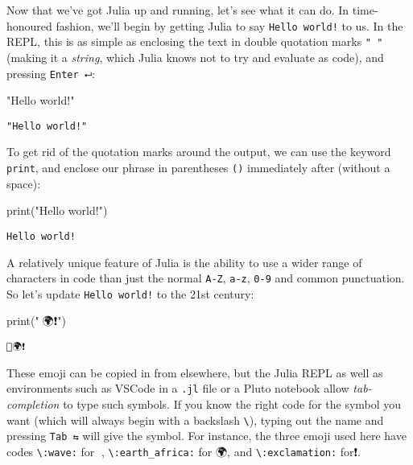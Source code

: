 \documentclass[
  letterpaper,
  DIV=11,
  numbers=noendperiod]{scrreprt}
\newenvironment{Shaded}{\begin{snugshade}}{\end{snugshade}}
\newcommand{\FunctionTok}[1]{\textcolor[rgb]{0.28,0.35,0.67}{#1}}
\newcommand{\NormalTok}[1]{\textcolor[rgb]{0.00,0.23,0.31}{#1}}
\newcommand{\StringTok}[1]{\textcolor[rgb]{0.13,0.47,0.30}{#1}}
\begin{document}
Now that we've got Julia up and running, let's see what it can do. In
time-honoured fashion, we'll begin by getting Julia to say
\texttt{Hello\ world!} to us. In the REPL, this is as simple as
enclosing the text in double quotation marks \texttt{"\ "} (making it a
\emph{string}, which Julia knows not to try and evaluate as code), and
pressing \texttt{Enter\ ⮠}:

\begin{Shaded}
\begin{Highlighting}[]
\StringTok{"Hello world!"}
\end{Highlighting}
\end{Shaded}

\begin{verbatim}
"Hello world!"
\end{verbatim}

To get rid of the quotation marks around the output, we can use the
keyword \texttt{print}, and enclose our phrase in parentheses
\texttt{()} immediately after (without a space):

\begin{Shaded}
\begin{Highlighting}[]
\FunctionTok{print}\NormalTok{(}\StringTok{"Hello world!"}\NormalTok{)}
\end{Highlighting}
\end{Shaded}

\begin{verbatim}
Hello world!
\end{verbatim}

A relatively unique feature of Julia is the ability to use a wider range
of characters in code than just the normal \texttt{A-Z}, \texttt{a-z},
\texttt{0-9} and common punctuation. So let's update
\texttt{Hello\ world!} to the 21st century:

\begin{Shaded}
\begin{Highlighting}[]
\FunctionTok{print}\NormalTok{(}\StringTok{"👋🌍❗"}\NormalTok{)}
\end{Highlighting}
\end{Shaded}

\begin{verbatim}
👋🌍❗
\end{verbatim}

These emoji can be copied in from elsewhere, but the Julia REPL as well
as environments such as VSCode in a \texttt{.jl} file or a Pluto
notebook allow \emph{tab-completion} to type such symbols. If you know
the right code for the symbol you want (which will always begin with a
backslash \texttt{\textbackslash{}}), typing out the name and pressing
\texttt{Tab\ ⇆} will give the symbol. For instance, the three emoji used
here have codes \texttt{\textbackslash{}:wave:} for 👋,
\texttt{\textbackslash{}:earth\_africa:} for 🌍, and
\texttt{\textbackslash{}:exclamation:} for❗.
\end{document}
